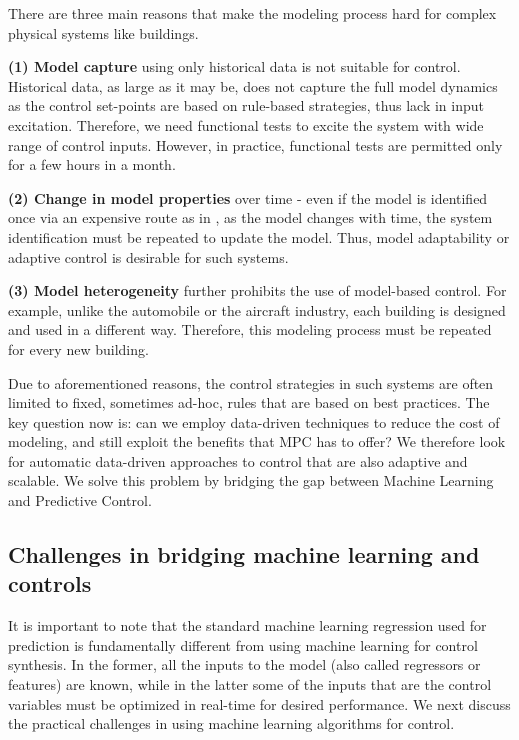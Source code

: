 There are three main reasons that make the modeling process hard for complex physical systems like buildings. 

\noindent \textbf{(1) Model capture} using only historical data is not suitable for control. Historical data, as large as it may be, does not capture the full model dynamics as the control set-points are based on rule-based strategies, thus lack in input excitation. Therefore, we need functional tests to excite the system with wide range of control inputs. However, in practice, functional tests are permitted only for a few hours in a month.

\noindent \textbf{(2) Change in model properties} over time - even if the model is identified once via an expensive route as in  \cite{Sturzenegger2016}, as the model changes with time, the system identification must be repeated to update the model. Thus, model adaptability or adaptive control is desirable for such systems. 

\noindent \textbf{(3) Model heterogeneity} further prohibits the use of model-based control. For example, unlike the automobile or the aircraft industry, each building is designed and used in a different way. Therefore, this modeling process must be repeated for every new building. 

Due to aforementioned reasons, the control strategies in such systems are often limited to fixed, sometimes ad-hoc, rules that are based on best practices. The key question now is: can we employ data-driven techniques to reduce the cost of modeling, and still exploit the benefits that MPC has to offer?
We therefore look for automatic data-driven approaches to control that are also adaptive and scalable.
We solve this problem by bridging the gap between Machine Learning and Predictive Control.

\subsection{Challenges in bridging machine learning and controls}
\label{SS:practical_challenges}


It is important to note that the standard machine learning regression used for prediction is fundamentally different from using machine learning for control synthesis. In the former, all the inputs to the model (also called regressors or features) are known, while in the latter some of the inputs that are the control variables must be optimized in real-time for desired performance. 
We next discuss the practical challenges in using machine learning algorithms for control.

